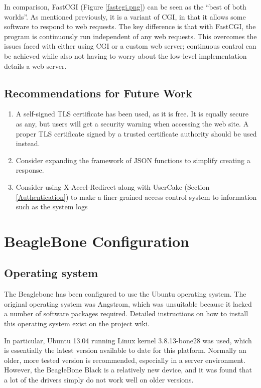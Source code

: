 In comparison, FastCGI (Figure \ref{fastcgi.png}) can be seen as the ``best of both worlds''. As mentioned previously, it is a variant of CGI, in that it allows some software to respond to web requests. The key difference is that with FastCGI, the program is continuously run independent of any web requests. This overcomes the issues faced with either using CGI or a custom web server; continuous control can be achieved while also not having to worry about the low-level implementation details a web server.



\subsection{Recommendations for Future Work}

\begin{enumerate}
	\item A self-signed TLS certificate has been used, as it is free. It is equally secure as any, but users will get a security warning when accessing the web site. A proper TLS certificate signed by a trusted certificate authority should be used instead.
	\item Consider expanding the framework of JSON functions to simplify creating a response. 
	\item Consider using X-Accel-Redirect along with UserCake (Section \ref{Authentication}) to make a finer-grained access control system to information such as the system logs
\end{enumerate}

\section{BeagleBone Configuration}\label{BeagleBone Configuration}

\subsection{Operating system}
The Beaglebone has been configured to use the Ubuntu operating system. The original operating system was Angstrom, which was unsuitable because it lacked a number of software packages required. Detailed instructions on how to install this operating system exist on the project wiki\cite{mctx3420_wiki}.

In particular, Ubuntu 13.04 running Linux kernel 3.8.13-bone28 was used, which is essentially the latest version available to date for this platform. Normally an older, more tested version is recommended, especially in a server environment. However, the BeagleBone Black is a relatively new device, and it was found that a lot of the drivers simply do not work well on older versions.

